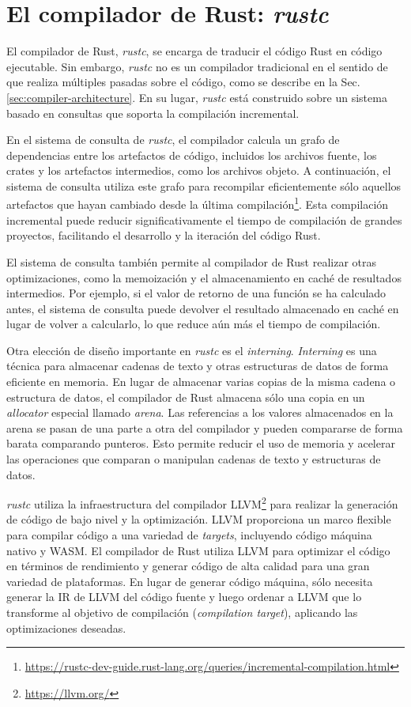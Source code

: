 \section{El compilador de Rust: \emph{rustc}}
\label{sec:rustc}

El compilador de Rust, \emph{rustc}, se encarga de traducir el código Rust en código ejecutable. Sin
embargo, \emph{rustc} no es un compilador tradicional en el sentido de que realiza múltiples pasadas
sobre el código, como se describe en la Sec. \ref{sec:compiler-architecture}.
En su lugar, \emph{rustc} está construido sobre un
sistema basado en consultas que soporta la compilación incremental.

En el sistema de consulta de \emph{rustc}, el compilador calcula un grafo de dependencias entre los
artefactos de código, incluidos los archivos fuente, los crates y los artefactos intermedios, como
los archivos objeto. A continuación, el sistema de consulta utiliza este grafo para recompilar
eficientemente sólo aquellos artefactos que hayan cambiado
desde la última compilación\footnote{\url{https://rustc-dev-guide.rust-lang.org/queries/incremental-compilation.html}}.
Esta compilación incremental puede reducir significativamente el tiempo de compilación de grandes
proyectos, facilitando el desarrollo y la iteración del código Rust.

El sistema de consulta también permite al compilador de Rust realizar otras optimizaciones,
como la memoización y el almacenamiento en caché de resultados intermedios. Por ejemplo, si
el valor de retorno de una función se ha calculado antes, el sistema de consulta puede devolver
el resultado almacenado en caché en lugar de volver a calcularlo, lo que reduce aún más el
tiempo de compilación.

Otra elección de diseño importante en \emph{rustc} es el \emph{interning}. \emph{Interning} es una técnica para
almacenar cadenas de texto y otras estructuras de datos de forma eficiente en memoria. En lugar de
almacenar varias copias de la misma cadena o estructura de datos, el compilador de Rust
almacena sólo una copia en un \textit{allocator} especial llamado \emph{arena}.
Las referencias a los valores almacenados en la arena se pasan
de una parte a otra del compilador y pueden compararse de forma barata comparando punteros.
Esto permite reducir el uso de memoria y
acelerar las operaciones que comparan o manipulan cadenas de texto y estructuras de datos.

\emph{rustc} utiliza la infraestructura del compilador LLVM\footnote{\url{https://llvm.org/}}
para realizar la generación de código de bajo nivel y la optimización.
LLVM proporciona un marco flexible para compilar código a
una variedad de \emph{targets}, incluyendo código máquina nativo y \acrfull{WASM}.
El compilador de Rust utiliza LLVM para optimizar el código en términos de rendimiento y
generar código de alta calidad para una gran variedad de plataformas. En lugar de generar
código máquina, sólo necesita generar la \acrfull{IR} de LLVM del código
fuente y luego ordenar a LLVM que lo transforme al objetivo de compilación (\textit{compilation target}),
aplicando las optimizaciones deseadas.

